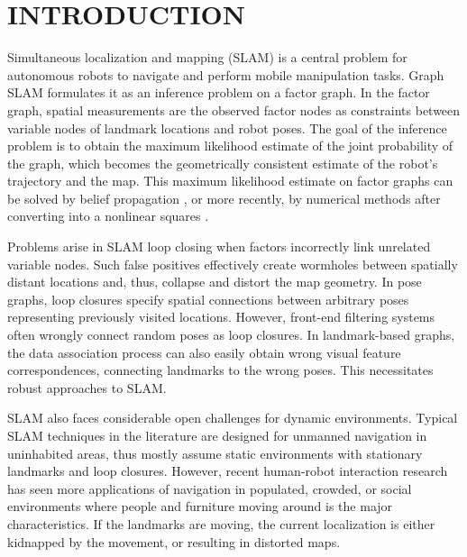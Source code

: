 \section{INTRODUCTION}

Simultaneous localization and mapping (SLAM) is a central problem for
autonomous robots to navigate and perform mobile manipulation tasks. %
Graph SLAM formulates it as an inference problem
on a factor graph. In the factor graph, spatial measurements are the observed factor nodes as constraints between variable nodes of landmark locations and robot poses. The goal of
the inference problem is to obtain the maximum likelihood estimate of the
joint probability of the graph, which becomes the geometrically consistent
estimate of the robot's trajectory and the map. This maximum likelihood estimate on factor graphs can be solved by belief propagation \cite{weiss}%
, or more recently, by numerical methods after converting into a nonlinear squares \cite{isam,g2o,olson2006fast}. %

Problems arise in SLAM loop closing when factors incorrectly link unrelated variable nodes.  Such false positives effectively create wormholes between spatially distant locations and, thus, collapse and distort the map geometry. In pose graphs, loop closures specify spatial connections between arbitrary poses representing previously visited locations.  However, front-end filtering systems  often wrongly connect random poses as loop closures.  In landmark-based graphs, the data association process can also easily obtain wrong visual feature correspondences, connecting landmarks to the wrong poses. This necessitates robust approaches to SLAM.

SLAM also faces considerable open challenges for dynamic environments.
Typical SLAM techniques in the literature are designed for unmanned navigation
in uninhabited areas, thus mostly assume static environments with stationary
landmarks and loop closures. However, recent human-robot interaction research
has seen more applications of navigation in populated, crowded, or social
environments where people and furniture moving around is the major
characteristics. If the landmarks are moving, the current localization is either
kidnapped by the movement, or resulting in distorted maps.

